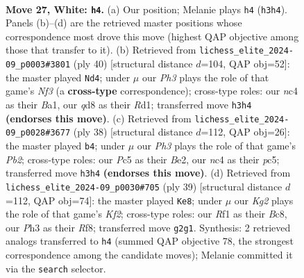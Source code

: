\documentclass[11pt]{article}
\begin{document}
\begin{figure}[p]
\label{fig:thought-m50}
\end{figure}

\clearpage

\begin{figure}[p]\centering
\begin{subfigure}{0.46\textwidth}\centering
\resizebox{\linewidth}{!}{%
\newchessgame
\chessboard[
  setfen={2bq1bk1/rp1pr2p/p3pp2/2P4Q/P1nP2B1/2N2N1P/1P3PK1/R1B2R2 w - - 3 27},
  showmover=false,
  pgfstyle=straightmove, color=movearrow, markmove={h3-h4}
]}
\caption{}
\end{subfigure}\hfill
\begin{subfigure}{0.46\textwidth}\centering
\resizebox{\linewidth}{!}{%
\newchessgame
\chessboard[
  setfen={r1b2rk1/6pp/p1n1p3/q2p1pP1/5P2/bP1BQN2/P1P4P/BK1R3R w - - 0 21},
  showmover=false,
  pgfstyle=straightmove, color=movearrow, markmove={f3-d4}
]}
\caption{}
\end{subfigure}
\\[4pt]
\begin{subfigure}{0.46\textwidth}\centering
\resizebox{\linewidth}{!}{%
\newchessgame
\chessboard[
  setfen={r1q1kb1r/p2n1pp1/4p2p/2p2b1P/2P5/P4N2/1P1QBPP1/R1B2RK1 w kq - 2 20},
  showmover=false,
  pgfstyle=straightmove, color=movearrow, markmove={b2-b4}
]}
\caption{}
\end{subfigure}\hfill
\begin{subfigure}{0.46\textwidth}\centering
\resizebox{\linewidth}{!}{%
\newchessgame
\chessboard[
  setfen={r1b2r2/pp2bkp1/2p1ppq1/2Pn4/2NP1PP1/P3P2Q/1P6/2KR1B1R b - - 2 20},
  showmover=false,
  pgfstyle=straightmove, color=movearrow, markmove={f7-e8}
]}
\caption{}
\end{subfigure}
\caption{\textbf{Move 27, White: \texttt{h4}.} (a) Our position; Melanie plays \texttt{h4} (\texttt{h3h4}). Panels (b)--(d) are the retrieved master positions whose correspondence most drove this move (highest QAP objective among those that transfer to it). (b) Retrieved from \texttt{lichess\_elite\_2024-09\_p0003\#3801} (ply 40) [structural distance $d$=104, QAP obj=52]: the master played \texttt{Nd4}; under $\mu$ our \emph{Ph3} plays the role of that game's \emph{Nf3} (a \textbf{cross-type} correspondence); cross-type roles: our \emph{n}c4 as their \emph{B}a1, our \emph{q}d8 as their \emph{R}d1; transferred move \texttt{h3h4} \textbf{(endorses this move)}. (c) Retrieved from \texttt{lichess\_elite\_2024-09\_p0028\#3677} (ply 38) [structural distance $d$=112, QAP obj=26]: the master played \texttt{b4}; under $\mu$ our \emph{Ph3} plays the role of that game's \emph{Pb2}; cross-type roles: our \emph{P}c5 as their \emph{B}e2, our \emph{n}c4 as their \emph{p}c5; transferred move \texttt{h3h4} \textbf{(endorses this move)}. (d) Retrieved from \texttt{lichess\_elite\_2024-09\_p0030\#705} (ply 39) [structural distance $d$=112, QAP obj=74]: the master played \texttt{Ke8}; under $\mu$ our \emph{Kg2} plays the role of that game's \emph{Kf2}; cross-type roles: our \emph{R}f1 as their \emph{B}c8, our \emph{P}h3 as their \emph{R}f8; transferred move \texttt{g2g1}. Synthesis: 2 retrieved analogs transferred to \texttt{h4} (summed QAP objective 78, the strongest correspondence among the candidate moves); Melanie committed it via the \texttt{search} selector.}

\end{figure}
\end{document}
